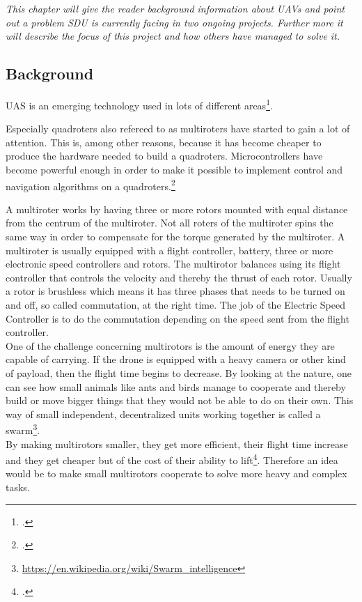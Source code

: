 \textit{This chapter will give the reader background information about UAVs and point out a problem SDU is currently facing in two ongoing projects. Further more it will describe the focus of this project and how others have managed to solve it.}
\subsection*{Background}
UAS is an emerging technology used in lots of different areas\footcite{gupta2013review}.

Especially quadroters also refereed to as multiroters have started to gain a lot of attention. This is, among other reasons, because it has become cheaper to produce the hardware needed to build a quadroters. Microcontrollers have become powerful enough in order to make it possible to implement control and navigation algorithms on a quadroters.\footcite{gibiansky2010quadcopter}

A multiroter works by having three or more rotors mounted with equal distance from the centrum of the multiroter.
Not all roters of the multiroter spins the same way in order to compensate for the torque generated by the multiroter.
A multiroter is usually equipped with a flight controller, battery, three or more electronic speed controllers and rotors.
The multirotor balances using its flight controller that controls the velocity and thereby the thrust of each rotor. Usually a rotor is brushless which means it has three phases that needs to be turned on and off, so called commutation, at the right time. The job of the Electric Speed Controller is to do the commutation depending on the speed sent from the flight controller. \\

One of the challenge concerning multirotors is the amount of energy they are capable of carrying. If the drone is equipped with a heavy camera or other kind of payload, then the flight time begins to decrease. 
By looking at the nature, one can see how small animals like ants and birds manage to cooperate and thereby build or move bigger things that they would not be able to do on their own. This way of small independent, decentralized units working together is called a swarm\footnote{\url{https://en.wikipedia.org/wiki/Swarm\_intelligence}}.\\
By making multirotors smaller, they get more efficient, their flight time increase and they get cheaper but of the cost of their ability to lift\footcite{1_kumar_2016}. Therefore an idea would be to make small multirotors cooperate to solve more heavy and complex tasks. \\

